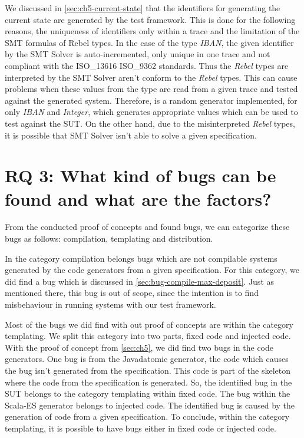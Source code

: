 
We discussed in \autoref{sec:ch5-current-state} that the identifiers for generating the current state are generated by the test framework. This is done for the following reasons, the uniqueness of identifiers only within a trace and the limitation of the SMT formulas of Rebel types. In the case of the type \textit{IBAN}, the given identifier by the SMT Solver is auto-incremented, only unique in one trace and not compliant with the ISO\_13616 ISO\_9362 standards. Thus the \textit{Rebel} types are interpreted by the SMT Solver aren't conform to the \textit{Rebel} types. This can cause problems when these values from the type are read from a given trace and tested against the generated system. Therefore, is a random generator implemented, for only \textit{IBAN} and \textit{Integer}, which generates appropriate values which can be used to test against the SUT. On the other hand, due to the misinterpreted \textit{Rebel} types, it is possible that SMT Solver isn't able to solve a given specification.


\section{RQ 3: What kind of bugs can be found and what are the factors?}

From the conducted proof of concepts and found bugs, we can categorize these bugs as follows: compilation, templating and distribution.

In the category compilation belongs bugs which are not compilable systems generated by the code generators from a given specification. For this category, we did find a bug which is discussed in \autoref{sec:bug-compile-max-deposit}. Just as mentioned there, this bug is out of scope, since the intention is to find misbehaviour in running systems with our test framework.

Most of the bugs we did find with out proof of concepts are within the category templating. We split this category into two parts, fixed code and injected code. With the proof of concept from \autoref{sec:ch5}, we did find two bugs in the code generators. One bug is from the Javadatomic generator, the code which causes the bug isn't generated from the specification. This code is part of the skeleton where the code from the specification is generated. So, the identified bug in the SUT belongs to the category templating within fixed code. The bug within the Scala-ES generator belongs to injected code. The identified bug is caused by the generation of code from a given specification. To conclude, within the category templating, it is possible to have bugs either in fixed code or injected code.

